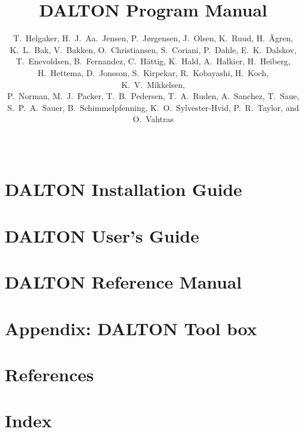 \documentclass[11pt,a4page]{report}
\begin{document}
%

%
\baselineskip=15pt
%
\title{DALTON Program Manual}

%
\author{T.~Helgaker, H.~J.~Aa.~Jensen, P.~J{\o}rgensen, J.~Olsen,
K.~Ruud, H.~{\AA}gren,\smallskip\\ 
K.~L.~Bak, 
V.~Bakken,
O.~Christiansen, 
S.~Coriani, 
P.~Dahle, 
E.~K.~Dalskov, \\ 
T.~Enevoldsen, 
B.~Fernandez,
C.~H{\"a}ttig,
K.~Hald,
A.~Halkier,
H.~Heiberg,\\ 
H.~Hettema, 
D.~Jonsson, 
S.~Kirpekar,
R.~Kobayashi,
H.~Koch,
K.~V.~Mikkelsen,\\
P.~Norman, 
M.~J.~Packer, 
T.~B.~Pedersen,
T.~A.~Ruden,
A.~Sanchez,
T.~Saue,\\
S.~P.~A.~Sauer,
B.~Schimmelpfenning,
K.~O.~Sylvester-Hvid,
P.~R.~Taylor, 
and O.~Vahtras}  
%
\date{\mbox{\ }}
%
\maketitle
%



\part{DALTON Installation Guide}


\part{DALTON User's Guide}











\part{DALTON Reference Manual}























\part{Appendix: DALTON Tool box}

\part{References}

%
\part{Index}
\printindex
\end{document}
